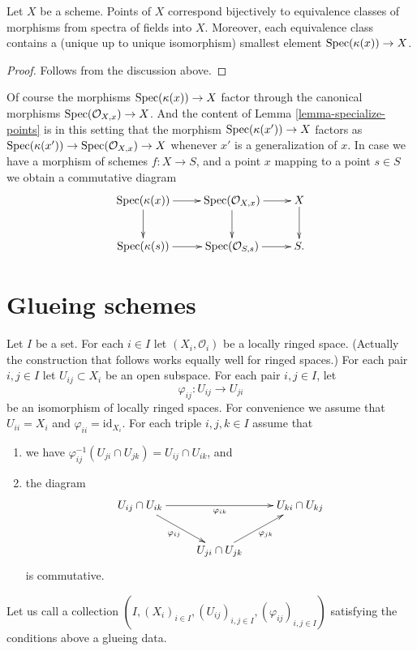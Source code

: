 \begin{lemma}
\label{lemma-characterize-points}
Let $X$ be a scheme. Points of $X$ correspond bijectively
to equivalence classes of morphisms from spectra of
fields into $X$. Moreover, each equivalence class contains
a (unique up to unique isomorphism) smallest element
$\mathop{\rm Spec}(\kappa(x)) \to X$.
\end{lemma}

\begin{proof}
Follows from the discussion above.
\end{proof}

\noindent
Of course the morphisms $\mathop{\rm Spec}(\kappa(x)) \to X$
factor through the canonical morphisms
$\mathop{\rm Spec}(\mathcal{O}_{X, x}) \to X$.
And the content of Lemma \ref{lemma-specialize-points} is in
this setting that the morphism $\mathop{\rm Spec}(\kappa(x')) \to X$
factors as
$\mathop{\rm Spec}(\kappa(x')) \to \mathop{\rm Spec}(\mathcal{O}_{X, x}) \to X$
whenever $x'$ is a generalization of $x$.
In case we have a morphism of schemes $f : X \to S$,
and a point $x$ mapping to a point $s \in S$ we obtain
a commutative diagram
$$
\xymatrix{
\Spec(\kappa(x)) \ar[r] \ar[d] &
\Spec(\mathcal{O}_{X, x}) \ar[r] \ar[d] &
X \ar[d] \\
\Spec(\kappa(s)) \ar[r] &
\Spec(\mathcal{O}_{S, s}) \ar[r] &
S.
}
$$










\section{Glueing schemes}
\label{section-glueing-schemes}

\noindent
Let $I$ be a set.
For each $i \in I$ let $(X_i, \mathcal{O}_i)$ be
a locally ringed space. (Actually the construction that
follows works equally well for ringed spaces.)
For each pair $i, j \in I$ let $U_{ij} \subset X_i$
be an open subspace.
For each pair $i, j \in I$, let
$$
\varphi_{ij} : U_{ij} \to U_{ji}
$$
be an isomorphism of locally ringed spaces.
For convenience we assume that $U_{ii} = X_i$ and
$\varphi_{ii} = \text{id}_{X_i}$.
For each triple $i, j, k \in I$ assume that
\begin{enumerate}
\item we have
$\varphi_{ij}^{-1}(U_{ji} \cap U_{jk}) =  U_{ij} \cap U_{ik}$, and
\item the diagram
$$
\xymatrix{
U_{ij} \cap U_{ik} \ar[rr]_{\varphi_{ik}} \ar[rd]_{\varphi_{ij}} & &
U_{ki} \cap U_{kj} \\
& U_{ji} \cap U_{jk} \ar[ru]_{\varphi_{jk}}
}
$$
is commutative.
\end{enumerate}
Let us call a collection
$(I, (X_i)_{i\in I}, (U_{ij})_{i, j\in I}, (\varphi_{ij})_{i, j\in I})$
satisfying the conditions above a glueing data.

